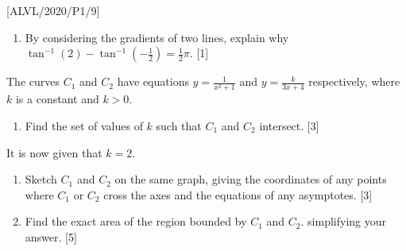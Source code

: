 \item {[}ALVL/2020/P1/9{]}
\begin{enumerate}
\item By considering the gradients of two lines, explain why $\tan^{-1}\left(2\right)-\tan^{-1}\left(-\frac{1}{2}\right)=\frac{1}{2}\pi$.
\hfill{}{[}1{]}
\end{enumerate}
The curves $C_{1}$ and $C_{2}$ have equations $y=\frac{1}{x^{2}+1}$
and $y=\frac{k}{3x+4}$ respectively, where $k$ is a constant and
$k>0$. 
\begin{enumerate}
\item Find the set of values of $k$ such that $C_{1}$ and $C_{2}$ intersect.\hfill{}
{[}3{]}
\end{enumerate}
It is now given that $k=2$.
\begin{enumerate}
\item Sketch $C_{1}$ and $C_{2}$ on the same graph, giving the coordinates
of any points where $C_{1}$ or $C_{2}$ cross the axes and the equations
of any asymptotes. \hfill{}{[}3{]}
\item Find the exact area of the region bounded by $C_{1}$ and $C_{2}$.
simplifying your answer.\hfill{} {[}5{]}
\end{enumerate}
